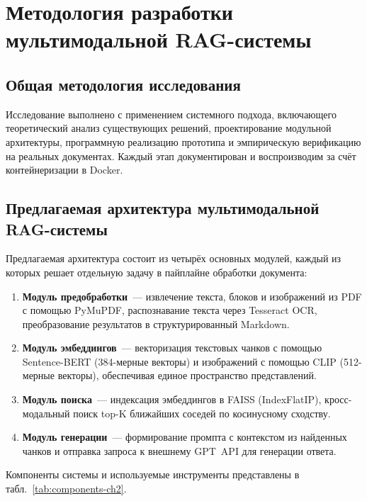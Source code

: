 \documentclass[a4paper,12pt]{article}
\begin{document}
\newpage

\section{Методология разработки мультимодальной RAG-системы}

\subsection{Общая методология исследования}
Исследование выполнено с применением системного подхода, включающего теоретический анализ существующих решений, проектирование модульной архитектуры, программную реализацию прототипа и эмпирическую верификацию на реальных документах. Каждый этап документирован и воспроизводим за счёт контейнеризации в Docker.

\subsection{Предлагаемая архитектура мультимодальной RAG-системы}

Предлагаемая архитектура состоит из четырёх основных модулей, каждый из которых решает отдельную задачу в пайплайне обработки документа:

\begin{enumerate}
    \item \textbf{Модуль предобработки}~--- извлечение текста, блоков и изображений из PDF с помощью PyMuPDF, распознавание текста через Tesseract OCR, преобразование результатов в структурированный Markdown.
    \item \textbf{Модуль эмбеддингов}~--- векторизация текстовых чанков с помощью Sentence-BERT (384-мерные векторы) и изображений с помощью CLIP (512-мерные векторы), обеспечивая единое пространство представлений.
    \item \textbf{Модуль поиска}~--- индексация эмбеддингов в FAISS (IndexFlatIP), кросс-модальный поиск top-K ближайших соседей по косинусному сходству.
    \item \textbf{Модуль генерации}~--- формирование промпта с контекстом из найденных чанков и отправка запроса к внешнему GPT~API для генерации ответа.
\end{enumerate}

Компоненты системы и используемые инструменты представлены в табл.~\ref{tab:components-ch2}.
\end{document}
